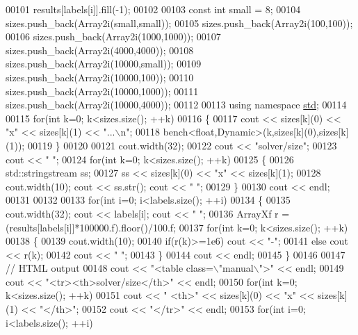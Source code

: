 \begin{DoxyCode}
00101     results[labels[i]].fill(-1);
00102 
00103   \textcolor{keyword}{const} \textcolor{keywordtype}{int} small = 8;
00104   sizes.push\_back(Array2i(small,small));
00105   sizes.push\_back(Array2i(100,100));
00106   sizes.push\_back(Array2i(1000,1000));
00107   sizes.push\_back(Array2i(4000,4000));
00108   sizes.push\_back(Array2i(10000,small));
00109   sizes.push\_back(Array2i(10000,100));
00110   sizes.push\_back(Array2i(10000,1000));
00111   sizes.push\_back(Array2i(10000,4000));
00112 
00113   \textcolor{keyword}{using namespace }\hyperlink{namespacestd}{std};
00114 
00115   \textcolor{keywordflow}{for}(\textcolor{keywordtype}{int} k=0; k<sizes.size(); ++k)
00116   \{
00117     cout << sizes[k](0) << \textcolor{stringliteral}{"x"} << sizes[k](1) << \textcolor{stringliteral}{"...\(\backslash\)n"};
00118     bench<float,Dynamic>(k,sizes[k](0),sizes[k](1));
00119   \}
00120 
00121   cout.width(32);
00122   cout << \textcolor{stringliteral}{"solver/size"};
00123   cout << \textcolor{stringliteral}{"  "};
00124   \textcolor{keywordflow}{for}(\textcolor{keywordtype}{int} k=0; k<sizes.size(); ++k)
00125   \{
00126     std::stringstream ss;
00127     ss << sizes[k](0) << \textcolor{stringliteral}{"x"} << sizes[k](1);
00128     cout.width(10); cout << ss.str(); cout << \textcolor{stringliteral}{" "};
00129   \}
00130   cout << endl;
00131 
00132 
00133   \textcolor{keywordflow}{for}(\textcolor{keywordtype}{int} i=0; i<labels.size(); ++i)
00134   \{
00135     cout.width(32); cout << labels[i]; cout << \textcolor{stringliteral}{"  "};
00136     ArrayXf r = (results[labels[i]]*100000.f).floor()/100.f;
00137     \textcolor{keywordflow}{for}(\textcolor{keywordtype}{int} k=0; k<sizes.size(); ++k)
00138     \{
00139       cout.width(10);
00140       \textcolor{keywordflow}{if}(r(k)>=1e6)  cout << \textcolor{stringliteral}{"-"};
00141       \textcolor{keywordflow}{else}           cout << r(k);
00142       cout << \textcolor{stringliteral}{" "};
00143     \}
00144     cout << endl;
00145   \}
00146 
00147   \textcolor{comment}{// HTML output}
00148   cout << \textcolor{stringliteral}{"<table class=\(\backslash\)"manual\(\backslash\)">"} << endl;
00149   cout << \textcolor{stringliteral}{"<tr><th>solver/size</th>"} << endl;
00150   \textcolor{keywordflow}{for}(\textcolor{keywordtype}{int} k=0; k<sizes.size(); ++k)
00151     cout << \textcolor{stringliteral}{"  <th>"} << sizes[k](0) << \textcolor{stringliteral}{"x"} << sizes[k](1) << \textcolor{stringliteral}{"</th>"};
00152   cout << \textcolor{stringliteral}{"</tr>"} << endl;
00153   \textcolor{keywordflow}{for}(\textcolor{keywordtype}{int} i=0; i<labels.size(); ++i)

\end{DoxyCode}
